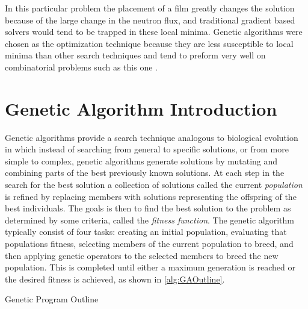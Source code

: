 In this particular problem the placement of a film greatly changes the solution because of the large change in the neutron flux, and traditional gradient based solvers would tend to be trapped in these local minima.
Genetic algorithms were chosen as the optimization technique because they are less susceptible to local minima than other search techniques and tend to preform very well on combinatorial problems such as this one \cite{Mitchell_1997}.

\section{Genetic Algorithm Introduction}
Genetic algorithms provide a search technique analogous to biological evolution in which instead of searching from general to specific solutions, or from more simple to complex, genetic algorithms generate solutions by mutating and combining parts of the best previously known solutions.
At each step in the search for the best solution a collection of solutions called the current \textit{population} is refined by replacing members with solutions representing the offspring of the best individuals.
The goals is then to find the best solution to the problem as determined by some criteria, called the \textit{fitness function}.
The genetic algorithm typically consist of four tasks: creating an initial population, evaluating that populations fitness, selecting members of the current population to breed, and then applying genetic operators to the selected members to breed the new population. 
This is completed until either a maximum generation is reached or the desired fitness is achieved, as shown in \autoref{alg:GAOutline}.
\begin{algorithm}
  \caption{Genetic Program Outline}
  \label{alg:GAOutline}
  \begin{algorithmic}
      \ENDFOR
      \ENDFOR
    \ENDWHILE
  \end{algorithmic}
\end{algorithm}

